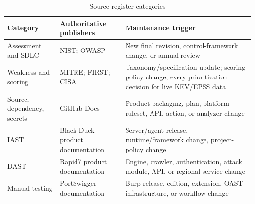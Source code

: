 \documentclass[11pt,letterpaper]{article}
\begin{document}
\begin{table}[H]
\centering
\caption{Source-register categories}
\small
\begin{tabularx}{\textwidth}{@{}L{1.7in}Y Y@{}}
\toprule
\textbf{Category} & \textbf{Authoritative publishers} & \textbf{Maintenance trigger} \\
\midrule
Assessment and SDLC & NIST; OWASP & New final revision, control-framework change, or annual review \\
Weakness and scoring & MITRE; FIRST; CISA & Taxonomy/specification update; scoring-policy change; every prioritization decision for live KEV/EPSS data \\
Source, dependency, secrets & GitHub Docs & Product packaging, plan, platform, ruleset, API, action, or analyzer change \\
IAST & Black Duck product documentation & Server/agent release, runtime/framework change, project-policy change \\
DAST & Rapid7 product documentation & Engine, crawler, authentication, attack module, API, or regional service change \\
Manual testing & PortSwigger documentation & Burp release, edition, extension, OAST infrastructure, or workflow change \\
\bottomrule
\end{tabularx}
\end{table}

\clearpage


\end{document}
